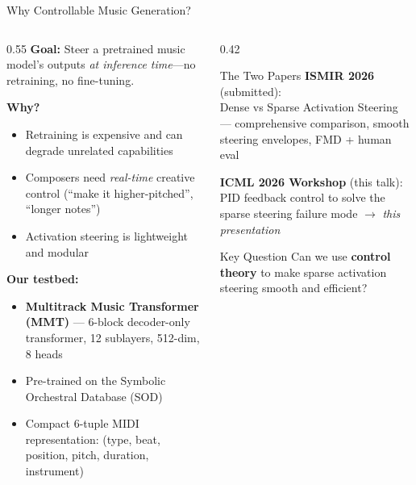 \documentclass[aspectratio=169, 11pt]{beamer}
\begin{document}
\begin{frame}{Why Controllable Music Generation?}

\begin{columns}[T]
\begin{column}{0.55\textwidth}
\textbf{Goal:} Steer a pretrained music model's outputs \emph{at inference time}---no retraining, no fine-tuning.

\vspace{0.5em}
\textbf{Why?}
\begin{itemize}
  \item Retraining is expensive and can degrade unrelated capabilities
  \item Composers need \emph{real-time} creative control (``make it higher-pitched'', ``longer notes'')
  \item Activation steering is lightweight and modular
\end{itemize}

\vspace{0.5em}
\textbf{Our testbed:}
\begin{itemize}
  \item \textbf{Multitrack Music Transformer (MMT)} --- 6-block decoder-only transformer, 12 sublayers, 512-dim, 8 heads
  \item Pre-trained on the Symbolic Orchestral Database (SOD)
  \item Compact 6-tuple MIDI representation: (type, beat, position, pitch, duration, instrument)
\end{itemize}
\end{column}

\begin{column}{0.42\textwidth}
\begin{block}{The Two Papers}
\small
\textbf{ISMIR 2026} (submitted):\\
Dense vs Sparse Activation Steering --- comprehensive comparison, smooth steering envelopes, FMD + human eval

\vspace{0.4em}
\textbf{ICML 2026 Workshop} (this talk):\\
PID feedback control to solve the sparse steering failure mode $\to$ \emph{this presentation}
\end{block}

\vspace{0.3em}
\begin{alertblock}{Key Question}
\small
Can we use \textbf{control theory} to make sparse activation steering smooth and efficient?
\end{alertblock}
\end{column}
\end{columns}

\end{frame}
\end{document}
